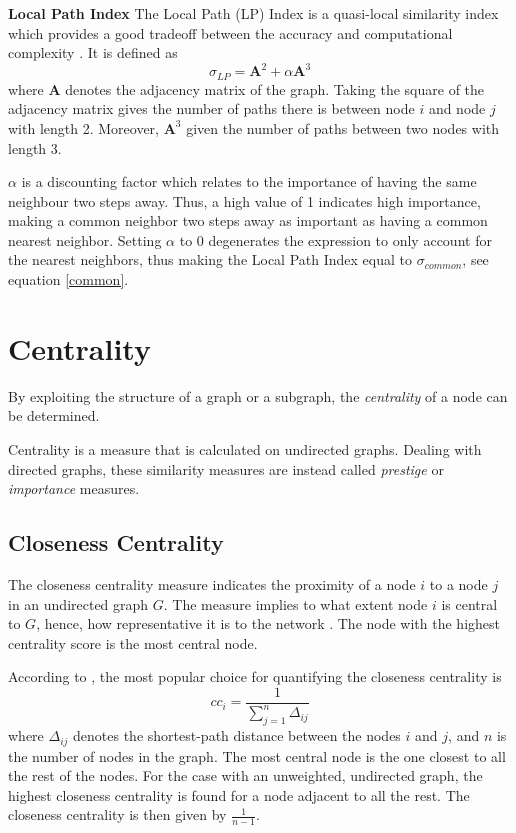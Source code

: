 \textbf{Local Path Index} The Local Path (LP) Index is a quasi-local similarity index which provides a good tradeoff between the accuracy and computational complexity \citep{lu2011}. It is defined as 
\begin{equation}
    \label{lp}
    \sigma_{LP} = \textbf{A}^2+\alpha \textbf{A}^3
\end{equation}
where $\textbf{A}$ denotes the adjacency matrix of the graph. Taking the square of the adjacency matrix gives the number of paths there is between node $i$ and node $j$ with length 2. Moreover, $\textbf{A}^3$ given the number of paths between two nodes with length 3. 

$\alpha$ is a discounting factor which relates to the importance of having the same neighbour two steps away. Thus, a high value of 1 indicates high importance, making a common neighbor two steps away as important as having a common nearest neighbor. Setting $\alpha$ to 0 degenerates the expression to only account for the nearest neighbors, thus making the Local Path Index equal to $\sigma_{common}$, see equation \eqref{common}.

\section{Centrality}
By exploiting the structure of a graph or a subgraph, the \textit{centrality} of a node can be determined. 

Centrality is a measure that is calculated on undirected graphs. Dealing with directed graphs, these similarity measures are instead called \textit{prestige} or \textit{importance} measures. \cite{fouss2016algorithms}


\subsection{Closeness Centrality}
The closeness centrality measure indicates the proximity of a node $i$ to a node $j$ in an undirected graph $G$. The measure implies to what extent node $i$ is central to $G$, hence, how representative it is to the network \citep{fouss2016algorithms}. The node with the highest centrality score is the most central node.

According to \citet{fouss2016algorithms}, the most popular choice for quantifying the closeness centrality is
\begin{equation}
    cc_i=\frac{1}{\sum_{j=1}^{n} \Delta_{ij}}
\end{equation}
where $\Delta_{ij}$ denotes the shortest-path distance between the nodes $i$ and $j$, and $n$ is the number of nodes in the graph. The most central node is the one closest to all the rest of the nodes. For the case with an unweighted, undirected graph, the highest closeness centrality is found for a node adjacent to all the rest. The closeness centrality is then given by $\frac{1}{n-1}$.

